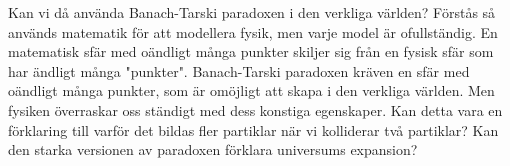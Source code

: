 \documentclass{article}
\theoremstyle{definition}
\begin{document}
Kan vi då använda Banach-Tarski paradoxen i den verkliga världen? Förstås så används matematik för att modellera fysik, 
men varje model är ofullständig. En matematisk sfär med oändligt många punkter skiljer sig från en fysisk sfär som har 
ändligt många "punkter". Banach-Tarski paradoxen kräven en sfär med oändligt många punkter, som är omöjligt att skapa i den verkliga världen. 
Men fysiken överraskar oss ständigt med dess konstiga egenskaper. Kan detta vara en förklaring till varför det bildas fler partiklar
när vi kolliderar två partiklar? Kan den starka versionen av paradoxen förklara universums expansion?
\end{document}
